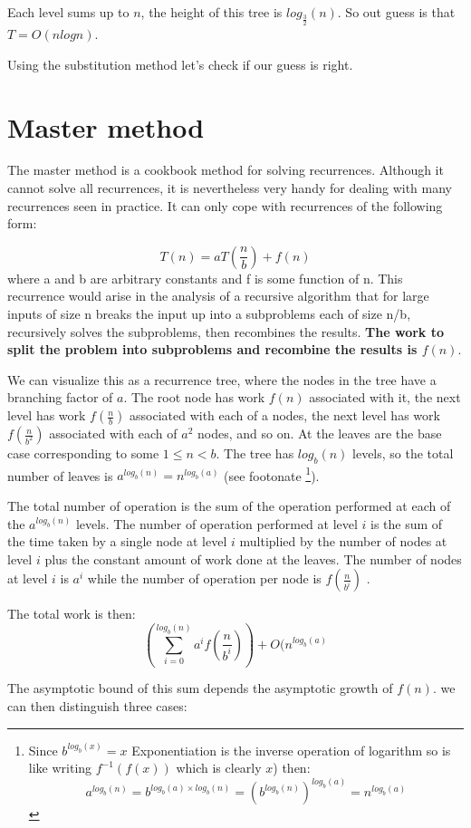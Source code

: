 Each level sums up to $n$, the height of this tree is $log_{\frac{3}{2}}(n)$. So out guess is that $T=O(nlogn)$.

Using the substitution method let's check if our guess is right.

\section{Master method}
The master method is a cookbook method for solving recurrences. Although it cannot solve all recurrences, it is nevertheless very handy for dealing with many recurrences seen in practice. It can only cope with recurrences of the following form:

\[T(n) = aT(\frac{n}{b}) +f(n)\]
where a and b are arbitrary constants and f is some function of n. This recurrence would arise in the analysis of a recursive algorithm that for large inputs of size n breaks the input up into a subproblems each of size n/b, recursively solves the subproblems, then recombines the results. \textbf{The work to split the problem into subproblems and recombine the results is $f(n)$}.

We can visualize this as a recurrence tree, where the nodes in the tree have a branching factor of $a$. The root node has work $f(n)$ associated with it, the next level has work $f(\frac{n}{b})$ associated with each of a nodes, the next level has work  $f(\frac{n}{b^2})$ associated with each of $a^2$ nodes, and so on. At the leaves are the base case corresponding to some $1 \leq n < b$. The tree has $log_b(n)$ levels, so the total number of leaves is $a^{log_b(n)} = n^{log_b(a)}$ (see footonate 
\footnote{Since $b^{log_b(x)} = x$ Exponentiation is the inverse operation of logarithm so is like writing $f^{-1}(f(x))$ which is clearly $x$) then:
\[a^{log_b(n)} = b^{log_b(a) \times log_b(n) } = (b^{log_b(n)})^{log_b(a)} = n^{log_b(a)}\]}).

The total number of operation is the sum of the operation performed at each of the $a^{log_b(n)}$ levels.
The number of operation performed at level $i$ is the sum of the time taken by a single node at level $i$ multiplied by the number of nodes at level $i$ plus the constant amount of work done at the leaves.
The number of nodes at level $i$ is $a^{i}$ while the number of operation per node is $f(\frac{n}{b^i})$ .

The total work is then:
\[
(\sum_{i=0}^{log_b(n)} a^i f(\frac{n}{b^i})) + O(n^{log_b(a)}
\]

The asymptotic bound of this sum depends the asymptotic growth of $f(n)$. we can then distinguish three cases:

